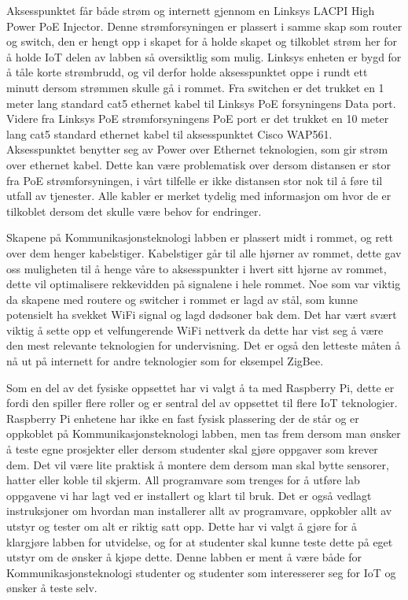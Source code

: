 \documentclass{article}
\begin{document}
Aksesspunktet får både strøm og internett gjennom en Linksys LACPI High Power PoE Injector. Denne strømforsyningen er plassert i samme skap som router og switch, den er hengt opp i skapet for å holde skapet og tilkoblet strøm her for å holde IoT delen av labben så oversiktlig som mulig. Linksys enheten er bygd for å tåle korte strømbrudd, og vil derfor holde aksesspunktet oppe i rundt ett minutt dersom strømmen skulle gå i rommet. Fra switchen er det trukket en 1 meter lang standard cat5 ethernet kabel til Linksys PoE forsyningens Data port. Videre fra Linksys PoE strømforsyningens PoE port er det trukket en 10 meter lang cat5 standard ethernet kabel til aksesspunktet Cisco WAP561. Aksesspunktet benytter seg av Power over Ethernet teknologien, som gir strøm over ethernet kabel. Dette kan være problematisk over dersom distansen er stor fra PoE strømforsyningen, i vårt tilfelle er ikke distansen stor nok til å føre til utfall av tjenester. Alle kabler er merket tydelig med informasjon om hvor de er tilkoblet dersom det skulle være behov for endringer.

Skapene på Kommunikasjonsteknologi labben er plassert midt i rommet, og rett over dem henger kabelstiger. Kabelstiger går til alle hjørner av rommet, dette gav oss muligheten til å henge våre to aksesspunkter i hvert sitt hjørne av rommet, dette vil optimalisere rekkevidden på signalene i hele rommet. Noe som var viktig da skapene med routere og switcher i rommet er lagd av stål, som kunne potensielt ha svekket WiFi signal og lagd dødsoner bak dem. Det har vært svært viktig å sette opp et velfungerende WiFi nettverk da dette har vist seg å være den mest relevante teknologien for undervisning. Det er også den letteste måten å nå ut på internett for andre teknologier som for eksempel ZigBee. 

Som en del av det fysiske oppsettet har vi valgt å ta med Raspberry Pi, dette er fordi den spiller flere roller og er sentral del av oppsettet til flere IoT teknologier. Raspberry Pi enhetene har ikke en fast fysisk plassering der de står og er oppkoblet på Kommunikasjonsteknologi labben, men tas frem dersom man ønsker å teste egne prosjekter eller dersom studenter skal gjøre oppgaver som krever dem. Det vil være lite praktisk å montere dem dersom man skal bytte sensorer, hatter eller koble til skjerm. All programvare som trenges for å utføre lab oppgavene vi har lagt ved er installert og klart til bruk. Det er også vedlagt instruksjoner om hvordan man installerer allt av programvare, oppkobler allt av utstyr og tester om alt er riktig satt opp. Dette har vi valgt å gjøre for å klargjøre labben for utvidelse, og for at studenter skal kunne teste dette på eget utstyr om de ønsker å kjøpe dette. Denne labben er ment å være både for Kommunikasjonsteknologi studenter og studenter som interesserer seg for IoT og ønsker å teste selv.
\end{document}
